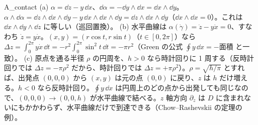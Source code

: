 \begin{soll}{A_contact}
(a) $\alpha=\dd z-y\,\dd x$、$\dd\alpha=-\dd y\wedge\dd x=\dd x\wedge\dd y$。$\alpha\wedge\dd\alpha=\dd z\wedge\dd x\wedge\dd y-y\,\dd x\wedge\dd x\wedge\dd y=\dd z\wedge\dd x\wedge\dd y$（$\dd x\wedge\dd x=0$）。これは $\dd x\wedge\dd y\wedge\dd z$ に等しい（巡回置換）。
(b) 水平曲線は $\alpha(\dot\gamma)=\dot z-y\dot x=0$、すなわち $\dot z=y\dot x$。$(x,y)=(r\cos t,r\sin t)$（$t\in[0,2\pi]$）なら $\Delta z=\int_0^{2\pi}y\dot x\,\dd t=-r^2\int_0^{2\pi}\sin^2t\,\dd t=-\pi r^2$（Green の公式 $\oint y\,\dd x=-\text{面積}$ と一致）。
(c) 原点を通る半径 $\rho$ の円周を、$h>0$ なら時計回りに 1 周する（反時計回りでは $\Delta z=-\pi\rho^2$ だから、時計回りでは $\Delta z=+\pi\rho^2$）。$\rho=\sqrt{h/\pi}$ とすれば、出発点 $(0,0,0)$ から $(x,y)$ は元の点 $(0,0)$ に戻り、$z$ は $h$ だけ増える。$h<0$ なら反時計回り。$\oint y\,\dd x$ は円周上のどの点から出発しても同じなので、$(0,0,0)\to(0,0,h)$ が水平曲線で結べる。$z$ 軸方向 $\partial_z$ は $D$ に含まれないにもかかわらず、水平曲線だけで到達できる（Chow--Rashevskii の定理の例\tC）。
\end{soll}
